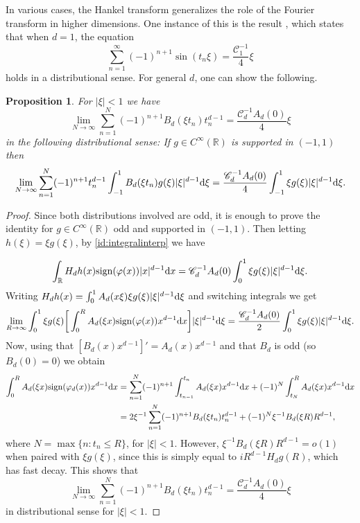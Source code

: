 \documentclass[a4paper,reqno,12pt]{amsart}
\newtheorem{proposition}[theorem]{Proposition}\newtheorem{corollary}[theorem]{Corollary}
\newcommand{\C}{\mathscr{C}}
\renewcommand{\r}{\mathbb{R}}
\newcommand{\p}{\varphi}
\renewcommand{\d}{{\rm d}}
\newcommand{\sign}{{\rm sign}}
\begin{document}
In various cases, the Hankel transform generalizes the role of the Fourier transform in higher dimensions. One instance of this is the result \cite[Lemma 2.3]{BORS2}, which states that when $d = 1$, the equation
\begin{equation*}
    \sum_{n = 1}^\infty (-1)^{n +1} \sin(t_n \xi) = \frac{\C_1^{-1}}{4 } \xi
\end{equation*}
holds in a distributional sense. For general $d$, one can show the following. 
\vspace{-0.5cm}
\begin{proposition}\label{prop:distid}
 For $|\xi|<1$ we have
$$
\lim_{N\to\infty} \sum_{n= 1}^{N} (-1)^{n+1} B_d( \xi t_n)t_n^{d-1} =   \frac{\C_d^{-1}A_d(0)}{4}  \xi
$$
in the following distributional sense: If $g \in C^\infty(\r)$ is supported in $(-1,1)$ then
$$
\lim_{N\to\infty} \sum_{n= 1}^{N}  (-1)^{n+1} t_n^{d-1} \int_{-1}^1 B_d( \xi t_n) g(\xi) |\xi|^{d-1} \d \xi = \frac{\C_d^{-1}A_d(0)}{4}  \int_{-1}^1 \xi g(\xi) |\xi|^{d-1} \d \xi.
$$
\end{proposition}
\begin{proof}
Since both distributions involved are odd, it is enough to prove the identity for $g\in C^\infty(\r)$ odd and supported in $(-1,1)$. Then letting $h(\xi) = \xi g(\xi)$, by \eqref{id:integralinterp} we have

\begin{equation*}
\int_\r  H_d h(x)\sign(\p(x))|x|^{d-1}\d x ={\C_d^{-1}A_d(0)}\int_{0}^1 \xi g(\xi)|\xi|^{d-1}\d \xi.
\end{equation*}
Writing $H_d h(x) =  \int_{0}^1 A_d(x \xi) \xi g(\xi) |\xi|^{d-1} \d \xi$ and switching integrals we get
$$
\lim_{R\to\infty} \int_{0}^1 \xi g(\xi) \bigg[\int_0^R  A_d(\xi x)\sign(\p(x))x^{d-1}\d x \bigg] |\xi|^{d-1} \d \xi = \frac{\C_d^{-1}A_d(0)}{2 } \int_{0}^1 \xi g(\xi)|\xi|^{d-1}\d \xi.
$$
Now,  using that $[B_d(x)x^{d-1}]' = A_d(x)x^{d-1}$ and that $B_d$ is odd (so $B_d(0)=0$) we obtain
\begin{align*}
\int_0^R  A_d(\xi x)\sign(\p_d(x))x^{d-1}\d x &= \sum_{n=1}^{N}(-1)^{n+1} \int_{t_{n-1}}^{t_n} A_d(\xi x) x^{d-1}\d x + (-1)^N \int_{t_N}^R A_d(\xi x) x^{d-1}\d x\\
& = 2\xi^{-1}\sum_{n= 1}^{N} (-1)^{n+1} B_d( \xi t_n)t_n^{d-1}+ (-1)^N  \xi^{-1}B_d(\xi R) R^{d-1},
\end{align*}
where $N = \max\{n: t_n \leq R\}$, for $|\xi|<1$. However, $\xi^{-1}B_d(\xi R) R^{d-1} = o(1)$ when paired with $\xi g(\xi)$, since this is simply equal to $iR^{d-1}H_d g(R)$, which has fast decay. This shows that 
$$
\lim_{N\to\infty} \sum_{n= 1}^{N} (-1)^{n+1} B_d( \xi t_n)t_n^{d-1} =\frac{\C_d^{-1}A_d(0)}{4} \xi
$$
in distributional sense for $|\xi|<1$. 
\end{proof}
\end{document}
